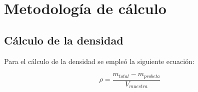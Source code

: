 \section{Metodología de cálculo}
\label{apend:Calculos}



\subsection{Cálculo de la densidad}
Para el cálculo de la densidad se empleó la siguiente ecuación:

\begin{equation}
	\rho = \frac{m_{total} - m_{probeta}}{V_{muestra}}
\end{equation}
